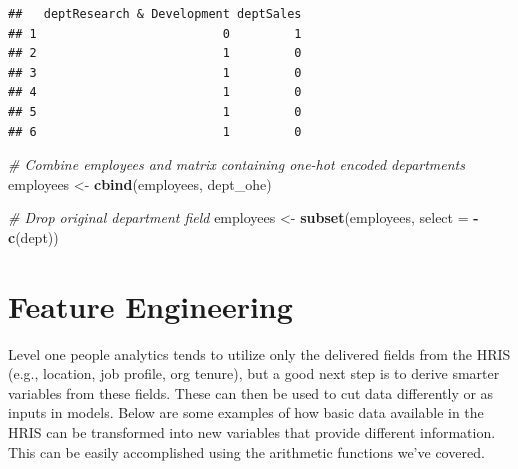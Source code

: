 \documentclass[]{book}
\newenvironment{Shaded}{\begin{snugshade}}{\end{snugshade}}
\newcommand{\CommentTok}[1]{\textcolor[rgb]{0.56,0.35,0.01}{\textit{#1}}}
\newcommand{\DataTypeTok}[1]{\textcolor[rgb]{0.13,0.29,0.53}{#1}}
\newcommand{\KeywordTok}[1]{\textcolor[rgb]{0.13,0.29,0.53}{\textbf{#1}}}
\newcommand{\NormalTok}[1]{#1}
\newcommand{\OperatorTok}[1]{\textcolor[rgb]{0.81,0.36,0.00}{\textbf{#1}}}
\newcommand{\StringTok}[1]{\textcolor[rgb]{0.31,0.60,0.02}{#1}}
\begin{document}
\begin{verbatim}
##   deptResearch & Development deptSales
## 1                          0         1
## 2                          1         0
## 3                          1         0
## 4                          1         0
## 5                          1         0
## 6                          1         0
\end{verbatim}

\begin{Shaded}
\begin{Highlighting}[]
\CommentTok{# Combine employees and matrix containing one-hot encoded departments}
\NormalTok{employees <-}\StringTok{ }\KeywordTok{cbind}\NormalTok{(employees, dept_ohe)}

\CommentTok{# Drop original department field}
\NormalTok{employees <-}\StringTok{ }\KeywordTok{subset}\NormalTok{(employees, }\DataTypeTok{select =} \OperatorTok{-}\KeywordTok{c}\NormalTok{(dept))}
\end{Highlighting}
\end{Shaded}

\hypertarget{feature-engineering}{%
\section{Feature Engineering}\label{feature-engineering}}

Level one people analytics tends to utilize only the delivered fields from the HRIS (e.g., location, job profile, org tenure), but a good next step is to derive smarter variables from these fields. These can then be used to cut data differently or as inputs in models. Below are some examples of how basic data available in the HRIS can be transformed into new variables that provide different information. This can be easily accomplished using the arithmetic functions we've covered.
\end{document}
